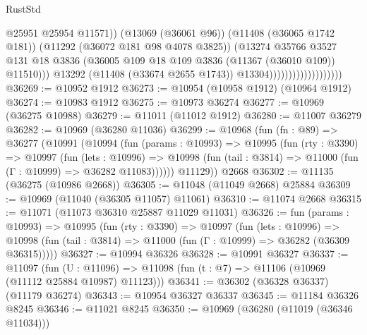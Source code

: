 \begin{lexlean}{RustStd}
\begin{coremodule}
                                                @25951
                                                @25954
                                                @11571))
                                            (@13069 (@36061 @96))
                                            (@11408 (@36065 @1742 @181))
                                            (@11292 (@36072 @181 @98 @4078 @3825))
                                            (@13274
                                              @35766
                                              @3527
                                              @131
                                              @18
                                              @3836
                                              (@36005
                                                @109
                                                @18
                                                @109
                                                @3836
                                                (@11367 (@36010 @109))
                                                @11510)))
                                          @13292
                                          (@11408 (@33674 @2655 @1743))
                                          @13304)))))))))))))))))))
@36269 := @10952 @1912
@36273 := @10954 (@10958 @1912) (@10964 @1912)
@36274 := @10983 @1912
@36275 := @10973 @36274
@36277 := @10969 (@36275 @10988)
@36279 := @11011 (@11012 @1912)
@36280 := @11007 @36279
@36282 := @10969 (@36280 @11036)
@36299 := @10968
    (fun (fn : @89) =>
    @36277
      (@10991
        (@10994
          (fun (params : @10993) =>
          @10995
            (fun (rty : @3390) =>
            @10997
              (fun (lets : @10996) =>
              @10998 (fun (tail : @3814) => @11000 (fun (Γ : @10999) => @36282 @11083))))))
        @11129))
    @2668
@36302 := @11135 (@36275 (@10986 @2668))
@36305 := @11048 (@11049 @2668) @25884
@36309 := @10969 (@11040 (@36305 @11057) @11061)
@36310 := @11074 @2668
@36315 := @11071 (@11073 @36310 @25887 @11029 @11031)
@36326 := fun (params : @10993) =>
  @10995
    (fun (rty : @3390) =>
    @10997
      (fun (lets : @10996) =>
      @10998 (fun (tail : @3814) => @11000 (fun (Γ : @10999) => @36282 (@36309 @36315)))))
@36327 := @10994 @36326
@36328 := @10991 @36327
@36337 := @11097
    (fun (U : @11096) => @11098 (fun (t : @7) => @11106 (@10969 (@11112 @25884 @10987) @11123)))
@36341 := @36302 (@36328 @36337) (@11179 @36274)
@36343 := @10954 @36327 @36337
@36345 := @11184 @36326 @8245
@36346 := @11021 @8245
@36350 := @10969 (@36280 (@11019 (@36346 @11034)))

\end{coremodule}
\end{lexlean}
